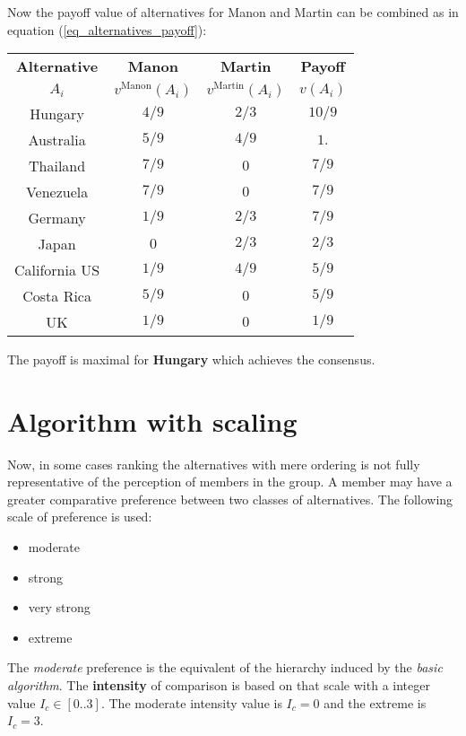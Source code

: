 \documentclass[12pt,a4paper]{article}
\begin{document}
\clearpage
Now the payoff value of alternatives for Manon and Martin can be combined as in equation (\ref{eq_alternatives_payoff}):
\begin{table}[ht]
\centering
\begin{tabular}{|c|c|c|c|}
\hline
\textbf{Alternative}&\textbf{Manon}&\textbf{Martin}&\textbf{Payoff}\\
$A_i$ & $v^{\mathrm{Manon}}(A_i)$ & $v^{\mathrm{Martin}}(A_i)$ & $v(A_i)$ \\
\hline
Hungary & $4/9$ & $2/3$ & $10/9$ \\
Australia & $5/9$ & $4/9$ & $1.$ \\
Thailand & $7/9$ & $0$ & $7/9$ \\
Venezuela & $7/9$ & $0$ & $7/9$ \\
Germany & $1/9$ & $2/3$ & $7/9$ \\
Japan & $0$ & $2/3$ & $2/3$ \\
California US & $1/9$ & $4/9$ & $5/9$ \\
Costa Rica & $5/9$ & $0$ & $5/9$ \\
UK & $1/9$ & $0$ & $1/9$ \\
\hline
\end{tabular}
\end{table}

The payoff is maximal for \textbf{Hungary} which achieves the consensus.

\section{Algorithm with scaling}\label{section_algorithm_with_scaling}

Now, in some cases ranking the alternatives with mere ordering is not fully representative of the perception of members in the group. A member may have a greater comparative preference between two classes of alternatives. The following scale of preference is used:
\begin{itemize}
\item moderate
\item strong
\item very strong
\item extreme
\end{itemize}
The \textsl{moderate} preference is the equivalent of the hierarchy induced by the \textsl{basic algorithm}. The \textbf{intensity} of comparison is based on that scale with a integer value $I_c\in[0..3]$. The moderate intensity value is $I_c=0$ and the extreme is $I_c=3$.
\end{document}
